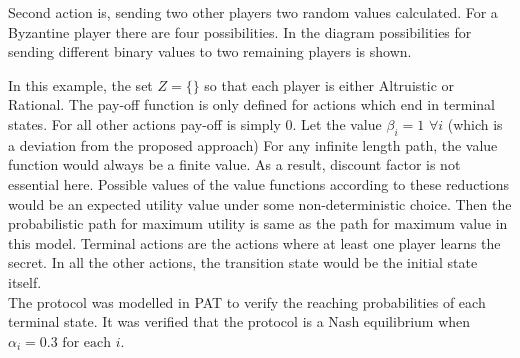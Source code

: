  
 Second action is, sending two other players two random values calculated. For a Byzantine player there are four possibilities. In the diagram possibilities for sending different binary values to two remaining players is shown.
 
 
 In this example, the set $Z=\{\}$ so that each player is either Altruistic or Rational. The pay-off function is only defined for actions which end in terminal states. For all other actions pay-off is simply $0$. Let the value $\beta_i=1$ $\forall i$ (which is a deviation from the proposed approach) For any infinite length path, the value function would always be a finite value. As a result, discount factor is not essential here. Possible values of the value functions according to these reductions would be an expected utility value under some non-deterministic choice. Then the probabilistic path for maximum utility is same as the path for maximum value in this model.
 Terminal actions are the actions where at least one player learns the secret. In all the other actions, the transition state would be the initial state itself.\\
 The protocol was modelled in PAT  to verify the reaching probabilities of each terminal state. It was verified that the protocol is a Nash equilibrium when $\alpha_i=0.3 \text{ for each }i$.
